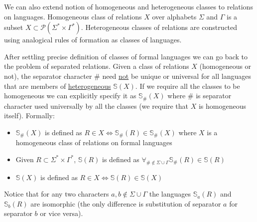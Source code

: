 \documentclass[12pt]{article}
\begin{document}
We can also extend notion of homogeneous and heterogeneous classes to relations on languages. Homogeneous class of relations $X$ over alphabets $\Sigma$ and $\Gamma$ is a subset $X \subset \mathcal{P}(\Sigma^* \times \Gamma^*)$. Heterogeneous classes of relations are constructed using analogical rules of formation as classes of languages.

After settling precise definition of classes of formal languages we can go back to the problem of separated relations. Given a class of relations $X$ (homogeneous or not), the separator character $\#$ need \underline{not} be unique or universal for all languages that are members of \underline{heterogeneous} $\mathbb{ S}(X)$. If we require all the classes to be homogeneous we can explicitly specify it as $\mathbb{ S}_\#(X)$ where $\#$ is separator character used universally by all the classes (we require that $X$ is homogeneous itself). Formally:
\begin{itemize}
	\item $\mathbb{ S}_\#(X) $ is defined as $ R \in X \iff \mathbb{ S}_\#(R) \in \mathbb{ S}_\#(X)  $ where $X$ is a homogeneous  class of relations on formal languages
	\item Given $R \subset \Sigma^* \times \Gamma^*$, $\mathbb{ S}(R)$  is defined as $\forall_{\# \notin \Sigma \cup \Gamma} \mathbb{ S}_\#(R) \in \mathbb{ S}(R)$ 
	\item $\mathbb{ S}(X)$ is defined as  $R \in X \iff \mathbb{ S}(R) \in \mathbb{ S}(X)  $
\end{itemize} 
 Notice that for any two characters $a,b \notin \Sigma \cup \Gamma$ the languages $\mathbb{S}_a(R)$ and $\mathbb{S}_b(R)$ are isomorphic (the only difference is substitution of separator $a$ for separator $b$ or vice versa). 
 
 
 
\end{document}
